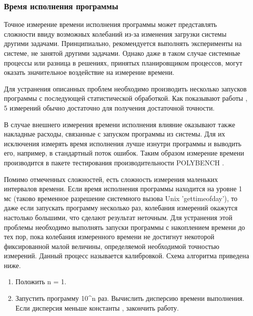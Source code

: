 \subsubsection{Время исполнения программы}
Точное измерение времени исполнения программы может представлять сложности ввиду возможных колебаний из-за изменения загрузки системы другими задачами. Принципиально, рекомендуется выполнять эксперименты на системе, не занятой другими задачами. Однако даже в таком случае системные процессы или разница в решениях, принятых планировщиком процессов, могут оказать значительное воздействие на измерение времени.

Для устранения описанных проблем необходимо производить несколько запусков программы с последующей статистической обработкой. Как показывают работы \cite{runs-number}, 5 измерений обычно достаточно для получения достаточной точности.

В случае внешнего измерения времени исполнения влияние оказывают также накладные расходы, связанные с запуском программы из системы. Для их исключения измерять время исполнения лучше изнутри программы и выводить его, например, в стандартный поток ошибок. Таким образом измерение времени производится в пакете тестирования производительности POLYBENCH \cite{polybench}.


Помимо отмеченных сложностей, есть сложность измерения маленьких интервалов времени. Если время исполнения программы находится на уровне 1 мс (таково временное разрешение системного вызова Unix 'gettimeofday'), то даже если запускать программу несколько раз, колебания измерений окажутся настолько большими, что сделают результат неточным. Для устранения этой проблемы необходимо выполнять запуски программы с накоплением времени до тех пор, пока колебания измеренного времени не достигнут некоторой фиксированной малой величины, определяемой необходимой точностью измерений. Данный процесс называется калибровкой. Схема алгоритма приведена ниже.

\begin{enumerate}
	\item Положить n = 1.
	\item Запустить программу 10^n раз. Вычислить дисперсию времени выполнения. Если дисперсия меньше константы \epsilon, закончить работу.
\end{enumerate}


